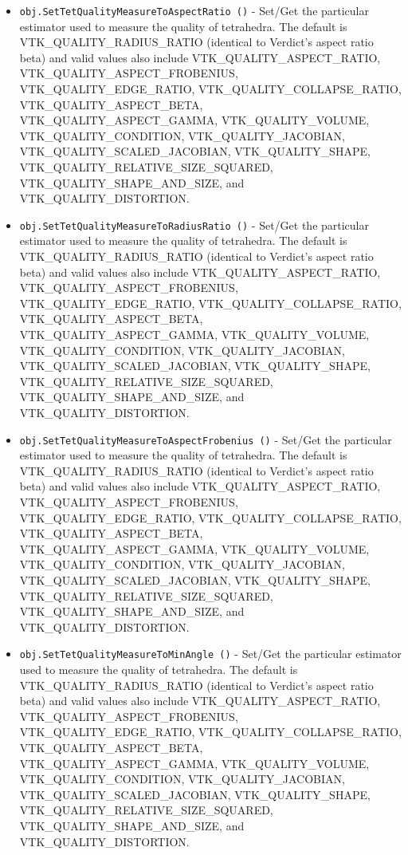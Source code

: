 \begin{itemize}
\item  \verb|obj.SetTetQualityMeasureToAspectRatio ()| -  Set/Get the particular estimator used to measure the quality of tetrahedra.
 The default is VTK\_QUALITY\_RADIUS\_RATIO (identical to Verdict's aspect
 ratio beta) and valid values also include
 VTK\_QUALITY\_ASPECT\_RATIO, VTK\_QUALITY\_ASPECT\_FROBENIUS, VTK\_QUALITY\_EDGE\_RATIO,
 VTK\_QUALITY\_COLLAPSE\_RATIO, VTK\_QUALITY\_ASPECT\_BETA, VTK\_QUALITY\_ASPECT\_GAMMA, 
 VTK\_QUALITY\_VOLUME, VTK\_QUALITY\_CONDITION, VTK\_QUALITY\_JACOBIAN, 
 VTK\_QUALITY\_SCALED\_JACOBIAN, VTK\_QUALITY\_SHAPE, VTK\_QUALITY\_RELATIVE\_SIZE\_SQUARED,
 VTK\_QUALITY\_SHAPE\_AND\_SIZE, and VTK\_QUALITY\_DISTORTION.

\item  \verb|obj.SetTetQualityMeasureToRadiusRatio ()| -  Set/Get the particular estimator used to measure the quality of tetrahedra.
 The default is VTK\_QUALITY\_RADIUS\_RATIO (identical to Verdict's aspect
 ratio beta) and valid values also include
 VTK\_QUALITY\_ASPECT\_RATIO, VTK\_QUALITY\_ASPECT\_FROBENIUS, VTK\_QUALITY\_EDGE\_RATIO,
 VTK\_QUALITY\_COLLAPSE\_RATIO, VTK\_QUALITY\_ASPECT\_BETA, VTK\_QUALITY\_ASPECT\_GAMMA, 
 VTK\_QUALITY\_VOLUME, VTK\_QUALITY\_CONDITION, VTK\_QUALITY\_JACOBIAN, 
 VTK\_QUALITY\_SCALED\_JACOBIAN, VTK\_QUALITY\_SHAPE, VTK\_QUALITY\_RELATIVE\_SIZE\_SQUARED,
 VTK\_QUALITY\_SHAPE\_AND\_SIZE, and VTK\_QUALITY\_DISTORTION.

\item  \verb|obj.SetTetQualityMeasureToAspectFrobenius ()| -  Set/Get the particular estimator used to measure the quality of tetrahedra.
 The default is VTK\_QUALITY\_RADIUS\_RATIO (identical to Verdict's aspect
 ratio beta) and valid values also include
 VTK\_QUALITY\_ASPECT\_RATIO, VTK\_QUALITY\_ASPECT\_FROBENIUS, VTK\_QUALITY\_EDGE\_RATIO,
 VTK\_QUALITY\_COLLAPSE\_RATIO, VTK\_QUALITY\_ASPECT\_BETA, VTK\_QUALITY\_ASPECT\_GAMMA, 
 VTK\_QUALITY\_VOLUME, VTK\_QUALITY\_CONDITION, VTK\_QUALITY\_JACOBIAN, 
 VTK\_QUALITY\_SCALED\_JACOBIAN, VTK\_QUALITY\_SHAPE, VTK\_QUALITY\_RELATIVE\_SIZE\_SQUARED,
 VTK\_QUALITY\_SHAPE\_AND\_SIZE, and VTK\_QUALITY\_DISTORTION.

\item  \verb|obj.SetTetQualityMeasureToMinAngle ()| -  Set/Get the particular estimator used to measure the quality of tetrahedra.
 The default is VTK\_QUALITY\_RADIUS\_RATIO (identical to Verdict's aspect
 ratio beta) and valid values also include
 VTK\_QUALITY\_ASPECT\_RATIO, VTK\_QUALITY\_ASPECT\_FROBENIUS, VTK\_QUALITY\_EDGE\_RATIO,
 VTK\_QUALITY\_COLLAPSE\_RATIO, VTK\_QUALITY\_ASPECT\_BETA, VTK\_QUALITY\_ASPECT\_GAMMA, 
 VTK\_QUALITY\_VOLUME, VTK\_QUALITY\_CONDITION, VTK\_QUALITY\_JACOBIAN, 
 VTK\_QUALITY\_SCALED\_JACOBIAN, VTK\_QUALITY\_SHAPE, VTK\_QUALITY\_RELATIVE\_SIZE\_SQUARED,
 VTK\_QUALITY\_SHAPE\_AND\_SIZE, and VTK\_QUALITY\_DISTORTION.


\end{itemize}
